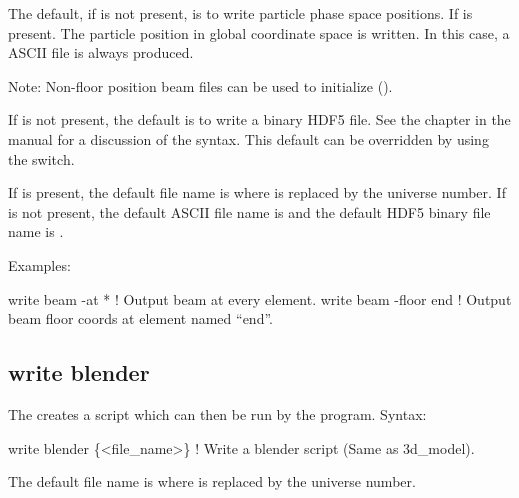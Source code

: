 {{{{{{{{{{{{The default, if  is not present, is to write particle phase space positions.
If  is present. The particle position in global coordinate space is written.
In this case, a ASCII file is always produced.

Note: Non-floor position beam files can be used to initialize \tao ().

If  is not present, the default is to write a binary HDF5 file. See the  chapter in the \bmad manual for a discussion of the syntax. This default can be overridden
by using the  switch.

If  is present, the default file name is  where \vn{\#} is
replaced by the universe number. If  is not present, the default ASCII file name
is  and the default HDF5 binary file name is .

Examples:
\begin{example}
  write beam -at *        ! Output beam at every element.
  write beam -floor end   ! Output beam floor coords at element named ``end''.
\end{example}


\subsection{write blender}
\label{s:write.blender}

The  creates a script which can then be run by
the  program\cite{b:blender}. Syntax:
\begin{example}
    write blender \{<file_name>\}            ! Write a blender script (Same as 3d_model).
\end{example}

The default file name is  where \vn{\#} is replaced by the universe number. 

}}}}}}}}}}}}
